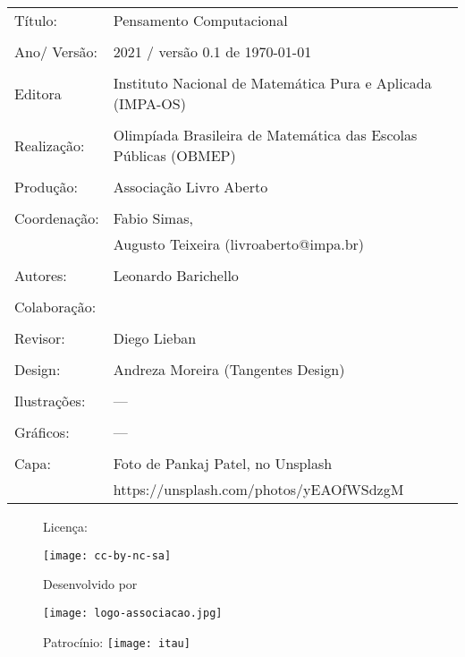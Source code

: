 \begin{tabular}{p{}p{}}
Título: & Pensamento Computacional\\
\\
Ano/ Versão: & 2021 / versão 0.1 de \today\\
\\
Editora & Instituto Nacional de Matem\'atica Pura e Aplicada (IMPA-OS)\\
\\
Realização:& Olimp\'iada Brasileira de Matem\'atica das Escolas P\'ublicas (OBMEP)\\
\\
Produção:& Associação Livro Aberto\\
\\
Coordenação: & Fabio Simas, \\
			&  Augusto Teixeira (livroaberto@impa.br)\\
\\
  Autores: & Leonardo Barichello\\
\\
Colaboração: & \\
\\
Revisor: & Diego Lieban \\
\\
Design: & Andreza Moreira (Tangentes Design) \\
\\
  Ilustrações: & --- \\ 
\\
Gráficos: & ---\\
\\
  Capa: & Foto de Pankaj Patel, no Unsplash \\
  		& https://unsplash.com/photos/yEAOfWSdzgM \\

\end{tabular}
\vspace{.5cm}



\begin{figure}[b]
\begin{minipage}[l]{5cm}
\centering

{\large Licença:}

  \texttt{[image: cc-by-nc-sa]}
\end{minipage}\hfill
\begin{minipage}[c]{5cm}
\centering
{\large Desenvolvido por}

\texttt{[image: logo-associacao.jpg]}
\end{minipage}
\begin{minipage}[r]{5cm}
\centering

{\large Patrocínio:}
  \vspace{1em}
  \texttt{[image: itau]}
\end{minipage}
\end{figure}

